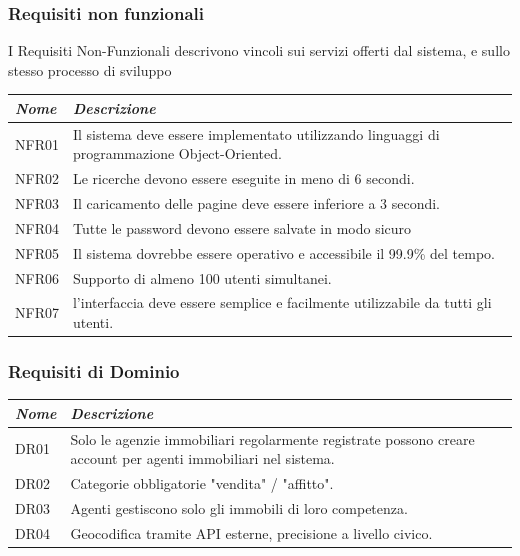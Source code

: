\documentclass{article}
\begin{document}
\subsubsection{Requisiti non funzionali}
I Requisiti Non-Funzionali descrivono vincoli sui servizi offerti dal
sistema, e sullo stesso processo di sviluppo


\begin{table}[h]
\centering
\begin{tabularx}{\textwidth}{|l|X|}
\hline
\rowcolor[HTML]{010066} 
{\color[HTML]{EFEFEF} \textit{\textbf{Nome}}} & {\color[HTML]{FFFFFF} \textit{\textit{Descrizione}}} \\ \hline
NFR01  &Il sistema deve essere implementato utilizzando linguaggi di programmazione 
Object-Oriented. \\ \hline
NFR02  & Le ricerche devono essere eseguite in meno di 6 secondi. \\ \hline
NFR03 &Il caricamento delle pagine deve essere inferiore a 3 secondi.  \\ \hline
NFR04 & Tutte le password devono essere salvate in modo sicuro \\ \hline
NFR05 & Il sistema dovrebbe essere operativo e accessibile il 99.9\% del tempo. \\ \hline
NFR06 & Supporto di almeno 100 utenti simultanei.\\ \hline
NFR07 & l’interfaccia deve essere semplice e facilmente utilizzabile da tutti gli utenti.\\ \hline

\end{tabularx}
\end{table}
\subsubsection{Requisiti di Dominio}

\begin{table}[h]
\centering
\begin{tabularx}{\textwidth}{|l|X|}
\hline
\rowcolor[HTML]{010066} 
{\color[HTML]{EFEFEF} \textit{\textbf{Nome}}} & {\color[HTML]{FFFFFF} \textit{\textit{Descrizione}}} \\ \hline
DR01  &Solo le agenzie immobiliari regolarmente registrate possono creare account per 
agenti immobiliari nel sistema.  \\ \hline
DR02  &Categorie obbligatorie "vendita" / "affitto".  \\ \hline
DR03  &Agenti gestiscono solo gli immobili di loro competenza.  \\ \hline
DR04  &Geocodifica tramite API esterne, precisione a livello civico.  \\ \hline

\end{tabularx}
\end{table}
\end{document}

